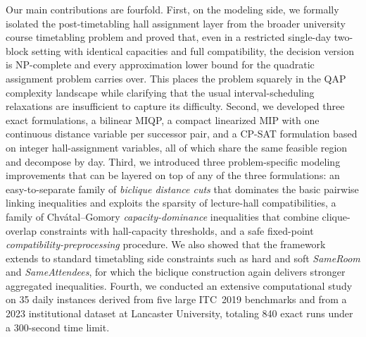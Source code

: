 \documentclass[11pt]{article}
\begin{document}
Our main contributions are fourfold. First, on the modeling side, we formally isolated the post-timetabling hall assignment layer from the broader university course timetabling problem and proved that, even in a restricted single-day two-block setting with identical capacities and full compatibility, the decision version is NP-complete and every approximation lower bound for the quadratic assignment problem carries over. This places the problem squarely in the QAP complexity landscape while clarifying that the usual interval-scheduling relaxations are insufficient to capture its difficulty. Second, we developed three exact formulations, a bilinear MIQP, a compact linearized MIP with one continuous distance variable per successor pair, and a CP-SAT formulation based on integer hall-assignment variables, all of which share the same feasible region and decompose by day. Third, we introduced three problem-specific modeling improvements that can be layered on top of any of the three formulations: an easy-to-separate family of \emph{biclique distance cuts} that dominates the basic pairwise linking inequalities and exploits the sparsity of lecture-hall compatibilities, a family of Chv\'atal--Gomory \emph{capacity-dominance} inequalities that combine clique-overlap constraints with hall-capacity thresholds, and a safe fixed-point \emph{compatibility-preprocessing} procedure. We also showed that the framework extends to standard timetabling side constraints such as hard and soft \emph{SameRoom} and \emph{SameAttendees}, for which the biclique construction again delivers stronger aggregated inequalities. Fourth, we conducted an extensive computational study on 35 daily instances derived from five large ITC~2019 benchmarks and from a 2023 institutional dataset at Lancaster University, totaling 840 exact runs under a 300-second time limit.
\end{document}
